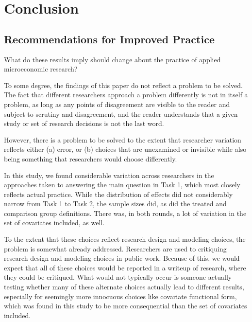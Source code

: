 \documentclass[
  letterpaper,
  DIV=11,
  numbers=noendperiod]{scrartcl}
\begin{document}
\hypertarget{conclusion}{%
\section{Conclusion}\label{conclusion}}

\hypertarget{recommendations-for-improved-practice}{%
\subsection{Recommendations for Improved
Practice}\label{recommendations-for-improved-practice}}

What do these results imply should change about the practice of applied
microeconomic research?

To some degree, the findings of this paper do not reflect a problem to
be solved. The fact that different researchers approach a problem
differently is not in itself a problem, as long as any points of
disagreement are visible to the reader and subject to scrutiny and
disagreement, and the reader understands that a given study or set of
research decisions is not the last word.

However, there is a problem to be solved to the extent that researcher
variation reflects either (a) error, or (b) choices that are unexamined
or invisible while also being something that researchers would choose
differently.

In this study, we found considerable variation across researchers in the
approaches taken to answering the main question in Task 1, which most
closely reflects actual practice. While the distribution of effects did
not considerably narrow from Task 1 to Task 2, the sample sizes did, as
did the treated and comparison group definitions. There was, in both
rounds, a lot of variation in the set of covariates included, as well.

To the extent that these choices reflect research design and modeling
choices, the problem is somewhat already addressed. Researchers are used
to critiquing research design and modeling choices in public work.
Because of this, we would expect that all of these choices would be
reported in a writeup of research, where they could be critiqued. What
would not typically occur is someone actually testing whether many of
these alternate choices actually lead to different results, especially
for seemingly more innocuous choices like covariate functional form,
which was found in this study to be more consequential than the set of
covariates included.
\end{document}

